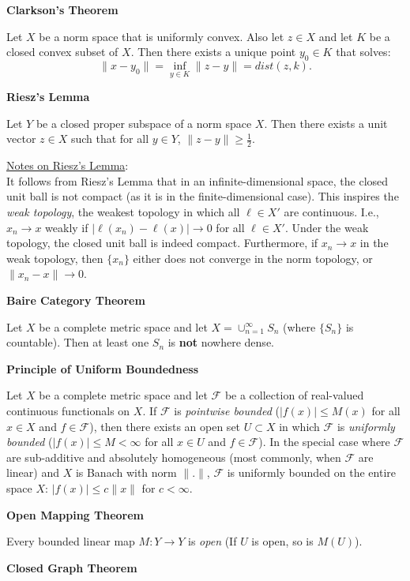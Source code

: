 \documentclass[12pt]{article}
\begin{document}
{\bf Clarkson's Theorem}

Let $X$ be a norm space that is uniformly convex.
Also let $z\in X$ and let $K$ be a closed convex subset of $X$.
Then there exists a unique point $y_0\in K$ that solves:
$$
\|x - y_0\| = \inf_{y\in K} \|z - y\| = dist(z,k).
$$\bigskip

{\bf Riesz's Lemma}

Let $Y$ be a closed proper subspace of a norm space $X$.
Then there exists a unit vector $z\in X$ such that for all $y\in Y$,
$\|z - y\| \geq \frac{1}{2}$.

\underline{Notes on Riesz's Lemma}:\\
It follows from Riesz's Lemma that in an infinite-dimensional space,
the closed unit ball is not compact (as it is in the finite-dimensional
case). This inspires the {\it weak topology}, the weakest topology in 
which all $\ell\in X'$ are continuous. I.e., $x_n \rightarrow x$ weakly
if $|\ell(x_n) - \ell(x)| \rightarrow 0$ for all $\ell \in X'$.
Under the weak topology, the closed unit ball is indeed compact.
Furthermore, if $x_n \rightarrow x$ in the weak topology, then 
$\{x_n\}$ either does not converge in the norm topology, or
$\|x_n - x\| \rightarrow 0$.
\bigskip

{\bf Baire Category Theorem}

Let $X$ be a complete metric space and let $X = \cup_{n=1}^\infty S_n$
(where $\{S_n\}$ is countable). Then at least one $S_n$ is {\bf not}
nowhere dense.
\bigskip

{\bf Principle of Uniform Boundedness}

Let $X$ be a complete metric space and let $\mathcal{F}$ be a collection
of real-valued continuous functionals on $X$.
If $\mathcal{F}$ is {\it pointwise bounded} ($|f(x)|\leq M(x)$ for all 
$x\in X$ and $f\in\mathcal{F}$), then there exists an open set $U\subset X$
in which $\mathcal{F}$ is {\it uniformly bounded}
($|f(x)|\leq M<\infty$ for all $x\in U$ and $f\in\mathcal{F}$).
In the special case where $\mathcal{F}$ are sub-additive and absolutely
homogeneous (most commonly, when $\mathcal{F}$ are linear) and $X$ is
Banach with norm $\|.\|$, $\mathcal{F}$ is uniformly bounded on the entire
space $X$:
$|f(x)| \leq c\|x\|$ for $c <\infty$.
\bigskip

{\bf Open Mapping Theorem}

Every bounded linear map $M : Y \rightarrow Y$ is {\it open}
(If $U$ is open, so is $M(U)$).
\bigskip

{\bf Closed Graph Theorem}
\end{document}
